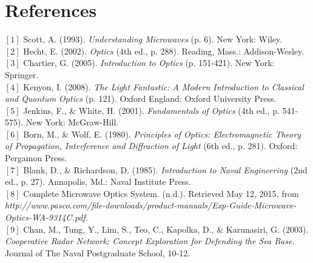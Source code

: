 \documentclass[a4paper,12pt]{report}
\begin{document}
\chapter{References}
$[1]$ Scott, A. (1993). \textit{Understanding Microwaves} (p. 6). New York: Wiley.\\
$[2]$ Hecht, E. (2002). \textit{Optics} (4th ed., p. 288). Reading, Mass.: Addison-Wesley.\\
$[3]$  Chartier, G. (2005). \textit{Introduction to Optics} (p. 151-421). New York: Springer.\\
$[4]$ Kenyon, I. (2008). \textit{The Light Fantastic: A Modern Introduction to Classical and Quantum Optics} (p. 121). Oxford England: Oxford University Press.\\
$[5]$ Jenkins, F., \& White, H. (2001). \textit{Fundamentals of Optics} (4th ed., p. 541-575). New York: McGraw-Hill.\\
$[6]$ Born, M., \& Wolf, E. (1980). \textit{Principles of Optics: Electromagnetic Theory of Propagation, Interference and Diffraction of Light} (6th ed., p. 281). Oxford: Pergamon Press.\\
$[7]$ Blank, D., \& Richardson, D. (1985). \textit{Introduction to Naval Engineering} (2nd ed., p. 27). Annapolis, Md.: Naval Institute Press.\\
$[8]$ Complete Microwave Optics System. (n.d.). Retrieved May 12, 2015, from \textit{http://www.pasco.com/file-downloads/product-manuals/Exp-Guide-Microwave-Optics-WA-9314C.pdf.}\\
$[9]$ Chan, M., Tung, Y., Lim, S., Teo, C., Kapolka, D., \& Karunasiri, G. (2003). \textit{Cooperative Radar Network: Concept Exploration for Defending the Sea Base.} Journal of The Naval Postgraduate School, 10-12.
\end{document}
